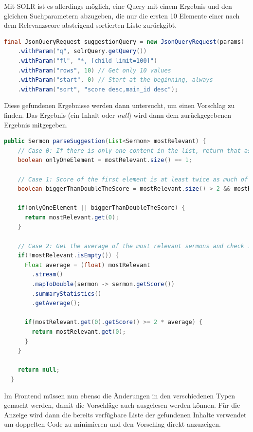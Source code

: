 Mit SOLR ist es allerdings möglich, eine Query mit einem Ergebnis und den gleichen Suchparametern abzugeben, die nur die ersten 10 Elemente einer nach dem Relevanzscore absteigend sortierten Liste zurückgibt.

\clearpage
\begin{lstlisting}[language=Java, label=code:SOLRSuggestionQuery, title={SOLR Query für die Top 10 Ergebnisse, absteigend sortiert nach Relevanz \cite{solr-search2022}}]
  final JsonQueryRequest suggestionQuery = new JsonQueryRequest(params)
    .withParam("q", solrQuery.getQuery())
    .withParam("fl", "*, [child limit=100]")
    .withParam("rows", 10) // Get only 10 values
    .withParam("start", 0) // Start at the beginning, always
    .withParam("sort", "score desc,main_id desc");
\end{lstlisting}

Diese gefundenen Ergebnisse werden dann untersucht, um einen Vorschlag zu finden. Das Ergebnis (ein Inhalt oder \emph{null}) wird dann dem zurückgegebenen Ergebnis mitgegeben.

\begin{lstlisting}[language=Java, label=code:parseSuggestion, title={Relevanteste Inhalte nach einem Vorschlag durchsuchen \cite{solr-search2022}}]
  public Sermon parseSuggestion(List<Sermon> mostRelevant) {
    // Case 0: If there is only one content in the list, return that as suggestion
    boolean onlyOneElement = mostRelevant.size() == 1;

    // Case 1: Score of the first element is at least twice as much of the second score
    boolean biggerThanDoubleTheScore = mostRelevant.size() > 2 && mostRelevant.get(0).getScore() >= 2 * mostRelevant.get(1).getScore();

    if(onlyOneElement || biggerThanDoubleTheScore) {
      return mostRelevant.get(0);
    }

    // Case 2: Get the average of the most relevant sermons and check if the first has at least twice as much of that
    if(!mostRelevant.isEmpty()) {
      Float average = (float) mostRelevant
        .stream()
        .mapToDouble(sermon -> sermon.getScore())
        .summaryStatistics()
        .getAverage();

      if(mostRelevant.get(0).getScore() >= 2 * average) {
        return mostRelevant.get(0);
      }
    }

    return null;
  }
\end{lstlisting}


\clearpage
Im Frontend müssen nun ebenso die Änderungen in den verschiedenen Typen gemacht werden, damit die Vorschläge auch ausgelesen werden können.
Für die Anzeige wird dann die bereits verfügbare Liste der gefundenen Inhalte verwendet um doppelten Code zu minimieren und den Vorschlag direkt anzuzeigen.


